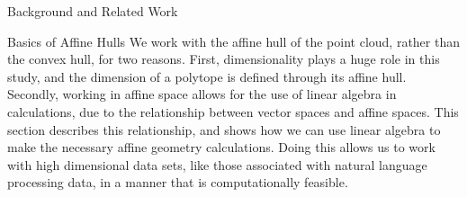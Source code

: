 \documentclass{llncs}
\begin{document}
\begin{section}{Background and Related Work}
\begin{subsection}{Basics of Affine Hulls}
We work with the affine hull of the point cloud, rather than the convex hull, for two reasons. First, dimensionality plays a huge role in this study, and the dimension of a polytope is defined through its affine hull. Secondly, working in affine space allows for the use of linear algebra in calculations, due to the relationship between vector spaces and affine spaces. This section describes this relationship, and shows how we can use linear algebra to make the necessary affine geometry calculations.  Doing this allows us to work with high dimensional data sets, like those associated with natural language processing data, in a manner that is computationally feasible.



\end{subsection}
\end{section}
\end{document}
